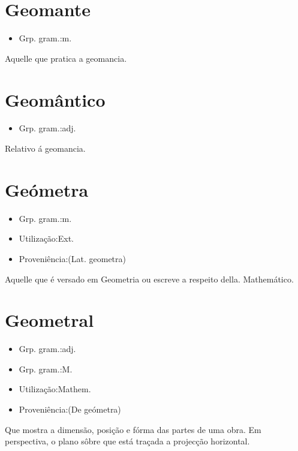\section{Geomante}
\begin{itemize}
\item {Grp. gram.:m.}
\end{itemize}
Aquelle que pratica a geomancia.
\section{Geomântico}
\begin{itemize}
\item {Grp. gram.:adj.}
\end{itemize}
Relativo á geomancia.
\section{Geómetra}
\begin{itemize}
\item {Grp. gram.:m.}
\end{itemize}
\begin{itemize}
\item {Utilização:Ext.}
\end{itemize}
\begin{itemize}
\item {Proveniência:(Lat. \textunderscore geometra\textunderscore )}
\end{itemize}
Aquelle que é versado em Geometria ou escreve a respeito della.
Mathemático.
\section{Geometral}
\begin{itemize}
\item {Grp. gram.:adj.}
\end{itemize}
\begin{itemize}
\item {Grp. gram.:M.}
\end{itemize}
\begin{itemize}
\item {Utilização:Mathem.}
\end{itemize}
\begin{itemize}
\item {Proveniência:(De \textunderscore geómetra\textunderscore )}
\end{itemize}
Que mostra a dimensão, posição e fórma das partes de uma obra.
Em perspectiva, o plano sôbre que está traçada a projecção horizontal.
